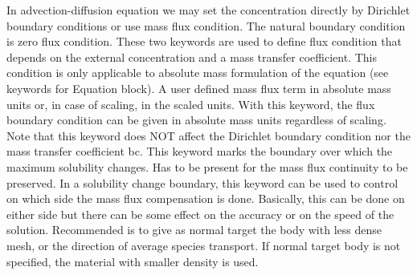 In advection-diffusion equation we may set the concentration directly 
by Dirichlet boundary conditions or use mass flux condition.
The natural boundary condition is zero flux condition.
\sifbegin
{}
These two keywords are used to define flux condition that depends on
the external concentration and a mass transfer coefficient. This
condition is only applicable to absolute mass formulation of the
equation (see keywords for Equation block).
 A user defined mass flux term in absolute
mass units or, in case of scaling, in the scaled units.
With this keyword, the flux boundary condition can be given in 
absolute mass units regardless of scaling. Note that this keyword does
NOT affect the Dirichlet boundary condition nor the mass transfer
coefficient bc.
This keyword marks the boundary over which the maximum solubility
changes. Has to be present for the mass flux continuity to be
preserved.
In a solubility change boundary, this keyword can be used to control 
on which side the mass flux compensation is done. Basically, this can
be done on either side but there can be some effect on
the accuracy or on the speed of the solution. Recommended is to give as
normal target the body with less dense mesh, or the direction of
average species transport. If normal target body is not specified, the
material with smaller density is used.
\sifend
\sifend
